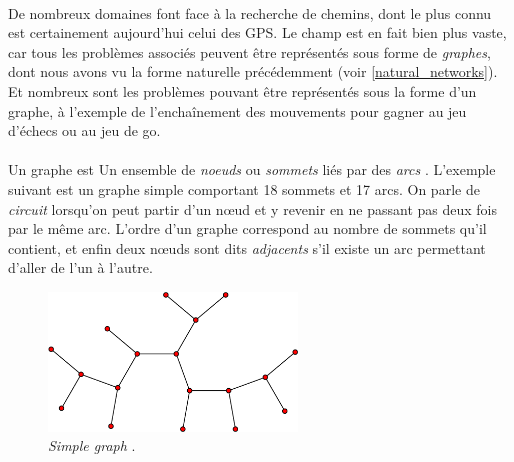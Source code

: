 \paragraph{} De nombreux domaines font face à la recherche de chemins, dont le plus connu est certainement aujourd'hui
celui des GPS. Le champ est en fait bien plus vaste, car tous les problèmes associés peuvent être représentés sous
forme de \emph{graphes}, dont nous avons vu la forme naturelle précédemment (voir \ref{natural_networks}). Et nombreux
sont les problèmes pouvant être représentés sous la forme d'un graphe, à l'exemple de l'enchaînement des mouvements pour
gagner au jeu d'échecs ou au jeu de go.

\paragraph{} Un graphe est \guillemotleft Un ensemble de \emph{noeuds} ou \emph{sommets} liés par des \emph{arcs}\guillemotright
\cite{AI1}. L'exemple suivant est un graphe simple comportant 18 sommets et 17 arcs. On parle de \emph{circuit} lorsqu'on
peut partir d'un n\oe{}ud et y revenir en ne passant pas deux fois par le même arc. L'ordre d'un graphe correspond au nombre
de sommets qu'il contient, et enfin deux n\oe{}uds sont dits \emph{adjacents} s'il existe un arc permettant d'aller de
l'un à l'autre.

\begin{figure}[ht]
    \centering
    \includegraphics[width=250px]{chapters/03/images/simple_graph.png}
    \caption{\label{graph}\emph{Simple graph} \cite{GraphTheory0}.}
\end{figure}

